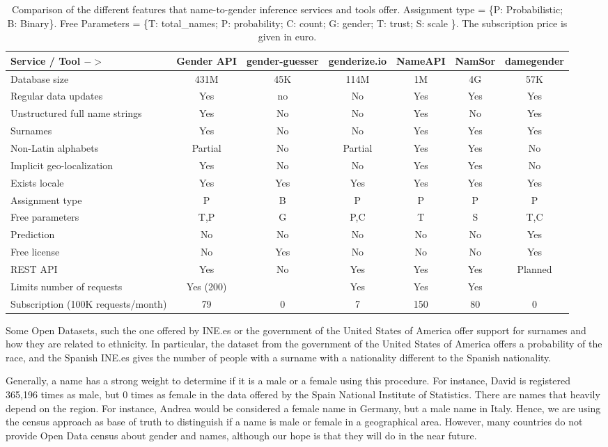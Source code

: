\documentclass[a4paper]{article}
\def\infinity{\rotatebox{90}{8}}
\begin{document}
\begin{table*}[ht]
\footnotesize
\begin{tabular}[]{lcccccc}
\hline
Service / Tool $->$ & Gender API & gender-guesser & genderize.io & NameAPI & NamSor & damegender\tabularnewline
\hline
Database size & 431M & 45K & 114M & 1M & 4G & 57K \tabularnewline
Regular data updates & Yes & no & No & Yes & Yes & Yes\tabularnewline
Unstructured full name strings & Yes & No & No & Yes & No & Yes\tabularnewline
Surnames & Yes & No & No & Yes & Yes & Yes\tabularnewline
Non-Latin alphabets & Partial & No & Partial & Yes & Yes & No\tabularnewline
Implicit geo-localization & Yes & No & No & Yes & Yes & No\tabularnewline
Exists locale & Yes & Yes & Yes & Yes & Yes & Yes\tabularnewline
Assignment type & P & B & P & P & P & P \tabularnewline
Free parameters & T,P & G & P,C & T & S & T,C\tabularnewline
Prediction & No & No & No & No & No & Yes\tabularnewline
Free license & No & Yes & No & No & No & Yes\tabularnewline
REST API & Yes & No & Yes & Yes & Yes & Planned\tabularnewline
Limits number of requests & Yes (200) & \infinity & Yes & Yes & Yes & \infinity \tabularnewline
Subscription (100K requests/month)	 & 79 & 0 & 7 & 150 & 80 & 0 \tabularnewline
\hline
\end{tabular}
\caption{Comparison of the different features that name-to-gender inference services and tools offer. Assignment type = \{P: Probabilistic; B: Binary\}. Free Parameters = \{T: total\_names; P: probability; C: count; G: gender; T: trust; S: scale \}. The subscription price is given in euro.}
\vspace{0.3cm}
\label{table:comparison}
\end{table*}


Some Open Datasets, such the one offered by INE.es or the government of the United States of America offer support for surnames and how they are related to ethnicity. 
In particular, the dataset from the government of the United States of America offers a probability of the race, and the Spanish INE.es gives the number of people with a surname with a nationality different to the Spanish nationality.

Generally, a name has a strong weight to determine if it is a male or a female using this procedure.
For instance, David is registered 365,196 times as male, but 0 times as female in the data offered by the Spain National Institute of Statistics.
There are names that heavily depend on the region. 
For instance, Andrea would be considered a female name in Germany, but a male name in Italy.
Hence, we are using the census approach as base of truth to distinguish if a name is male or female in a geographical area. 
However, many countries do not provide Open Data census about gender and names, although our hope is that they will do in the near future.
\end{document}
